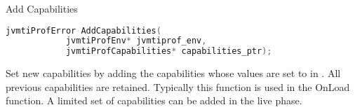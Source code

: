 \begin{apidef}{Add Capabilities}
\begin{lstlisting}[language=C]
jvmtiProfError AddCapabilities(
            jvmtiProfEnv* jvmtiprof_env,
            jvmtiProfCapabilities* capabilities_ptr);
\end{lstlisting}

\begin{apidesc}
Set new capabilities by adding the capabilities whose values are set to  in . All previous capabilities are retained. Typically this function is used in the OnLoad function. A limited set of capabilities can be added in the live phase. 
\end{apidesc}

\begin{apiphase}
\apiphaseonloadlive
\end{apiphase}

\begin{apicap}
\apicaprequired
\end{apicap}

\begin{apiparam}
\end{apiparam}

\begin{apierror}
\end{apierror}
\end{apidef}
